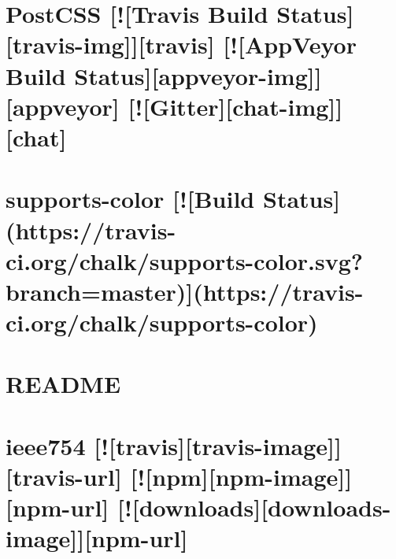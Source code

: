 \documentclass[twoside]{book}
\newcommand{\+}{\discretionary{\mbox{\scriptsize$\hookleftarrow$}}{}{}}
\begin{document}
\chapter{Post\+C\+SS \mbox{[}!\mbox{[}Travis Build Status\mbox{]}\mbox{[}travis-\/img\mbox{]}\mbox{]}\mbox{[}travis\mbox{]} \mbox{[}!\mbox{[}App\+Veyor Build Status\mbox{]}\mbox{[}appveyor-\/img\mbox{]}\mbox{]}\mbox{[}appveyor\mbox{]} \mbox{[}!\mbox{[}Gitter\mbox{]}\mbox{[}chat-\/img\mbox{]}\mbox{]}\mbox{[}chat\mbox{]}}
\label{md__c_1_workspace_demo_src_main_script_node_modules_icss-utils_node_modules_postcss__r_e_a_d_m_e}

\chapter{supports-\/color \mbox{[}!\mbox{[}Build Status\mbox{]}(https\+://travis-\/ci.org/chalk/supports-\/color.svg?branch=master)\mbox{]}(https\+://travis-\/ci.org/chalk/supports-\/color)}
\label{md__c_1_workspace_demo_src_main_script_node_modules_icss-utils_node_modules_supports-color_readme}

\chapter{R\+E\+A\+D\+ME}
\label{md__c_1_workspace_demo_src_main_script_node_modules_icss-utils__r_e_a_d_m_e}

\chapter{ieee754 \mbox{[}!\mbox{[}travis\mbox{]}\mbox{[}travis-\/image\mbox{]}\mbox{]}\mbox{[}travis-\/url\mbox{]} \mbox{[}!\mbox{[}npm\mbox{]}\mbox{[}npm-\/image\mbox{]}\mbox{]}\mbox{[}npm-\/url\mbox{]} \mbox{[}!\mbox{[}downloads\mbox{]}\mbox{[}downloads-\/image\mbox{]}\mbox{]}\mbox{[}npm-\/url\mbox{]}}
\label{md__c_1_workspace_demo_src_main_script_node_modules_ieee754__r_e_a_d_m_e}

\end{document}
